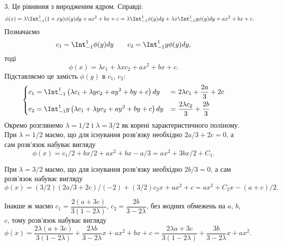 \begin{solution}
    \begin{enumerate}
        \item[3.] Це рівняння з виродженим ядром. Справді: 
        \[ \phi(x) = \lambda\Int_{-1}^1 (1 + xy) \phi(y) dy + ax^2 + bx + c = \lambda \Int_{-1}^1 \phi(y) dy + \lambda x \Int_{-1}^1 y \phi(y) dy + ax^2 + bx + c. \]
        Позначаємо
        \[ c_1 = \Int_{-1}^1 \phi(y) dy \qquad c_2 = \Int_{-1}^1 y \phi(y) dy, \]
        тоді
        \[ \phi(x) = \lambda c_1 + \lambda x c_2 + ax^2 + bx + c. \]
        Підставляємо це замість $\phi(y)$ в $c_1$, $c_2$:
        \begin{equation*}\left\{\begin{aligned}
            c_1 &= \Int_{-1}^1 \left(\lambda c_1 + \lambda y c_2 + ay^2 + by + c\right) dy &=& \,\, 2\lambda c_1 + \dfrac{2a}{3} + 2c \\
            c_2 &=  \Int_{-1}^1 y \left(\lambda c_1 + \lambda y c_2 + ay^2 + by + c\right) dy &=& \,\, \dfrac{2\lambda c_2}{3} + \dfrac{2b}{3}
        \end{aligned}\right.\end{equation*}
        Окремо розглянемо $\lambda = 1/2$ і $\lambda = 3/2$ як корені характеристичного поліному.\\
        
        При $\lambda = 1/2$ маємо, що для існування розв'язку необхідно $2a/3 + 2c = 0$, а сам розв'язок набуває вигляду \[\phi(x) = c_1/2 + bx/2 + ax^2 + bx - a/3 = ax^2 + 3bx/2 + C_1.\]
        
        При $\lambda = 3/2$ маємо, що для існування розв'язку необхідно $2b/3 = 0$, а сам розв'язок набуває вигляду \[\phi(x) = (3/2)(2a/3 + 2c)/(-2) + (3/2)c_2 x + ax^2 + c = ax^2 + C_2x - (a + c)/2.\]
        
        Інакше ж маємо $c_1 = \dfrac{2(a + 3c)}{3(1 - 2\lambda)}$, $c_2 = \dfrac{2b}{3 - 2 \lambda}$, без жодних обмежень на $a$, $b$, $c$, тому розв'язок набуває вигляду \[\phi(x) = \dfrac{2\lambda(a + 3c)}{3(1 - 2\lambda)} + \dfrac{2\lambda b}{3 - 2 \lambda}x + ax^2 + bx + c = \dfrac{2\lambda a + 3c}{3(1 - 2\lambda)} + \dfrac{3b}{3 - 2 \lambda}x + ax^2.\]
        

\end{enumerate}
\end{solution}
